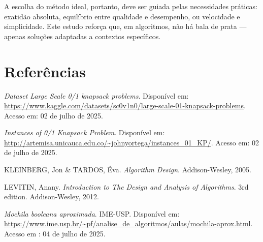\documentclass[12pt]{article}
\begin{document}
A escolha do método ideal, portanto, deve ser guiada pelas necessidades práticas: exatidão absoluta, equilíbrio entre qualidade e desempenho, ou velocidade e simplicidade. Este estudo reforça que, em algoritmos, não há bala de prata --- apenas soluções adaptadas a contextos específicos.

\section{Referências}

\begin{thebibliography}{1}

\textit{Dataset Large Scale 0/1 knapsack problems}. Disponível em: \url{https://www.kaggle.com/datasets/sc0v1n0/large-scale-01-knapsack-problems}. Acesso em: 02 de julho de 2025.

\textit{Instances of 0/1 Knapsack Problem}. Disponível em: \url{http://artemisa.unicauca.edu.co/~johnyortega/instances_01_KP/}. Acesso em: 02 de julho de 2025.

 KLEINBERG, Jon \& TARDOS, Éva. \textit{Algorithm Design}. Addison-Wesley, 2005.

LEVITIN, Anany. \textit{Introduction to The Design and Analysis of Algorithms}. 3rd edition. Addison-Wesley, 2012.

 \textit{Mochila booleana aproximada}. IME-USP. Disponível em: \url{https://www.ime.usp.br/~pf/analise_de_algoritmos/aulas/mochila-aprox.html}. Acesso em : 04 de julho de 2025.

\end{thebibliography}
\end{document}

